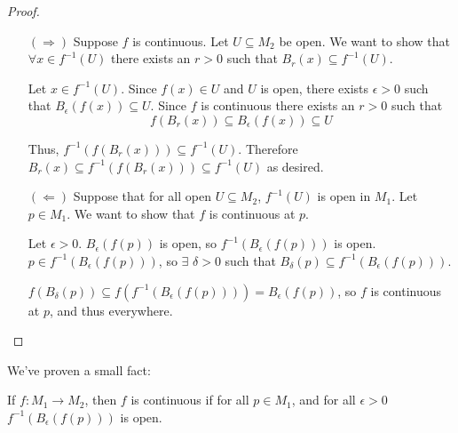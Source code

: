 \begin{proof}
	\mbox{ }\\
	\begin{itemize}
		\item[$(\Rightarrow)$] Suppose $f$ is continuous. Let $U \subseteq M_2$ be open. We want to show that $\forall x \in f^{-1} (U)$ there exists an $r>0$ such that $B_r (x) \subseteq f^{-1} (U)$.
		
		Let $x\in f^{-1} (U)$. Since $f(x)\in U$ and $U$ is open, there exists $\epsilon >0$ such that $B_\epsilon (f(x)) \subseteq U$. Since $f$ is continuous there exists an $r>0$ such that
		\[f(B_r (x)) \subseteq B_\epsilon (f(x)) \subseteq U\]
		
		Thus, $f^{-1} (f(B_r (x))) \subseteq f^{-1} (U)$. Therefore $B_r (x) \subseteq f^{-1} (f(B_r (x))) \subseteq f^{-1} (U)$ as desired.
		
		\item[$(\Leftarrow)$] Suppose that for all open $U\subseteq M_{2}$, $f^{-1}(U)$ is open in $M_{1}$. Let $p \in M_{1}$. We want to show that $f$ is continuous at $p$.
		
		Let $\epsilon > 0$. $B_{\epsilon}(f(p))$ is open, so $f^{-1}(B_{\epsilon}(f(p)))$ is open. $p\in f^{-1}(B_{\epsilon}(f(p)))$, so $\exists$ $\delta>0$ such that $B_{\delta}(p)\subseteq f^{-1}(B_{\epsilon}(f(p)))$.
		
		$f(B_{\delta}(p))\subseteq f(f^{-1}(B_{\epsilon}(f(p))))=B_{\epsilon}(f(p))$, so $f$ is continuous at $p$, and thus everywhere. 
	\end{itemize}
\end{proof}

We've proven a small fact: 
\begin{smallfact}
	If $f : M_{1} \rightarrow M_{2}$, then $f$ is continuous if for all $p\in M_{1}$, and for all $\epsilon>0$ $f^{-1}(B_{\epsilon}(f(p)))$ is open. 
\end{smallfact}

